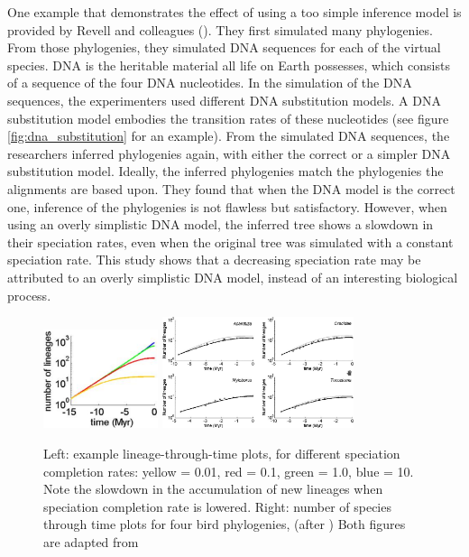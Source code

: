 One example that demonstrates the effect of using a too simple inference model
is provided by Revell and colleagues (\cite{revell2005under}).
They first simulated many phylogenies.
From those phylogenies, they simulated DNA sequences for each of
the virtual species.
DNA is the heritable material all life on Earth possesses,
which consists of a sequence of the four DNA nucleotides.
In the simulation of the DNA sequences, the experimenters
used different DNA substitution models.
A DNA substitution model embodies the transition rates of these nucleotides (see
figure \ref{fig:dna_substitution} for an example).
From the simulated DNA sequences, the researchers inferred phylogenies again,
with either the correct or a simpler DNA substitution model.
Ideally, the inferred phylogenies match the phylogenies the alignments are based upon.
They found that when the DNA model is the correct one, inference of the
phylogenies is not flawless but satisfactory.
However, when using an overly simplistic DNA model, 
the inferred tree shows a slowdown in their speciation rates, 
even when the original tree was simulated with a constant speciation rate.
This study shows that a decreasing speciation rate may be attributed
to an overly simplistic DNA model, instead of an interesting biological process.

\begin{figure}[H]

  \includegraphics[width=0.3\textwidth]{etienne_rosindell_2011_ltt.png}
  \includegraphics[width=0.5\textwidth]{etienne_rosindell_2011.png}
  \caption{
    Left: example lineage-through-time plots, for different 
    speciation completion rates: yellow = 0.01, red = 0.1, green = 1.0, blue = 10.
    Note the slowdown in the accumulation of new lineages when speciation completion
    rate is lowered.
    Right: number of species through time plots for four bird phylogenies, 
    (after \cite{phillimore2008density})
    Both figures are adapted from \cite{etienne2012prolonging}
 }
  \label{fig:etienne2012prolonging}
\end{figure}

